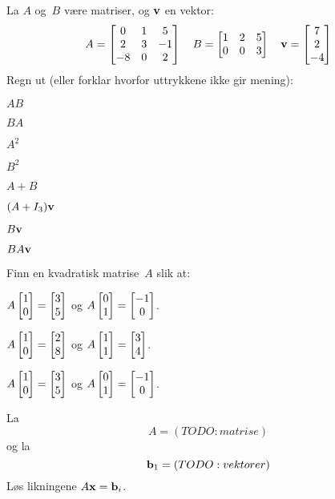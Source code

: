 
\begin{oppgave}
La $A$ og~$B$ være matriser, og $\mathbf{v}$ en vektor:
\[
A =
\begin{bmatrix}
 0 & 1 &  5 \\
 2 & 3 & -1 \\
-8 & 0 & 2
\end{bmatrix}
\quad
B =
\begin{bmatrix}
1 & 2 & 5 \\
0 & 0 & 3
\end{bmatrix}
\quad
\mathbf{v} = \begin{bmatrix} 7 \\ 2 \\ -4 \end{bmatrix}
\]
Regn ut (eller forklar hvorfor uttrykkene ikke gir mening):
\begin{punkt}
$AB$
\end{punkt}
\begin{punkt}
$BA$
\end{punkt}
\begin{punkt}
$A^2$
\end{punkt}
\begin{punkt}
$B^2$
\end{punkt}
\begin{punkt}
$A+B$
\end{punkt}
\begin{punkt}
$(A + I_3) \mathbf{v}$
\end{punkt}
\begin{punkt}
$B\mathbf{v}$
\end{punkt}
\begin{punkt}
$BA\mathbf{v}$
\end{punkt}
\end{oppgave}


\begin{oppgave}
\end{oppgave}


\begin{oppgave}
Finn en kvadratisk matrise~$A$ slik at:
\begin{punkt}
$A \begin{bmatrix} 1 \\ 0 \end{bmatrix} = \begin{bmatrix} 3 \\ 5 \end{bmatrix}$
og
$A \begin{bmatrix} 0 \\ 1 \end{bmatrix} = \begin{bmatrix} -1 \\ 0 \end{bmatrix}$.
\end{punkt}
\begin{punkt}
$A \begin{bmatrix} 1 \\ 0 \end{bmatrix} = \begin{bmatrix} 2 \\ 8 \end{bmatrix}$
og
$A \begin{bmatrix} 1 \\ 1 \end{bmatrix} = \begin{bmatrix} 3 \\ 4 \end{bmatrix}$.
\end{punkt}
\begin{punkt}
$A \begin{bmatrix} 1 \\ 0 \end{bmatrix} = \begin{bmatrix} 3 \\ 5 \end{bmatrix}$
og
$A \begin{bmatrix} 0 \\ 1 \end{bmatrix} = \begin{bmatrix} -1 \\ 0 \end{bmatrix}$.
\end{punkt}
\end{oppgave}


\begin{oppgave}
La
\[
A = (TODO:matrise)
\]
og la
\[
\mathbf{b}_1 = (TODO:vektorer)
\]
Løs likningene $A \mathbf{x} = \mathbf{b}_i$.
\end{oppgave}


\begin{oppgave}
\end{oppgave}
